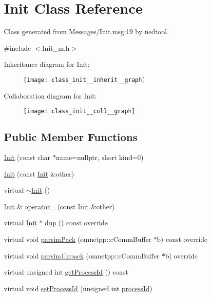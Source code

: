 \hypertarget{class_init}{}\section{Init Class Reference}
\label{class_init}


Class generated from {\ttfamily Messages/\+Init.\+msg\+:19} by nedtool.  




{\ttfamily \#include $<$Init\+\_\+m.\+h$>$}



Inheritance diagram for Init\+:\nopagebreak
\begin{figure}[H]
\begin{center}
\leavevmode
\texttt{[image: class\_init\_\_inherit\_\_graph]}
\end{center}
\end{figure}


Collaboration diagram for Init\+:\nopagebreak
\begin{figure}[H]
\begin{center}
\leavevmode
\texttt{[image: class\_init\_\_coll\_\_graph]}
\end{center}
\end{figure}
\subsection*{Public Member Functions}
\begin{DoxyCompactItemize}
\item 
\hyperlink{class_init_a763a386107f8ea21acfd24f243e0f73c}{Init} (const char $\ast$name=nullptr, short kind=0)
\item 
\hyperlink{class_init_a9d26400c5fabf20571808ad773524669}{Init} (const \hyperlink{class_init}{Init} \&other)
\item 
virtual \hyperlink{class_init_a67d5c94cb965fa3b774e969cfb4969d1}{$\sim$\+Init} ()
\item 
\hyperlink{class_init}{Init} \& \hyperlink{class_init_ab995dd231981ed97018c00b5fd8e9797}{operator=} (const \hyperlink{class_init}{Init} \&other)
\item 
virtual \hyperlink{class_init}{Init} $\ast$ \hyperlink{class_init_ad1e6c6b247eae6eaac5dd8e9dc9cdce0}{dup} () const override
\item 
virtual void \hyperlink{class_init_a73df5d54ec41b9980e98dbfc12875145}{parsim\+Pack} (omnetpp\+::c\+Comm\+Buffer $\ast$b) const override
\item 
virtual void \hyperlink{class_init_ab3728913400c516dbb31c8fed392d32d}{parsim\+Unpack} (omnetpp\+::c\+Comm\+Buffer $\ast$b) override
\item 
virtual unsigned int \hyperlink{class_init_a73d525231ae76ad98442d6f5b86bb994}{get\+Process\+Id} () const
\item 
virtual void \hyperlink{class_init_ae0331d367c559e5859841ab0cafb9a71}{set\+Process\+Id} (unsigned int \hyperlink{class_init_a3adbaa4c454127a34eaab69297b44585}{process\+Id})
\end{DoxyCompactItemize}
